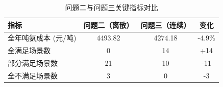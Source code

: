 \begin{table}[H]
\centering
\caption{问题二与问题三关键指标对比}
\begin{tabular}{lccc}
\toprule
指标 & 问题二（离散） & 问题三（连续） & 变化 \\
\midrule
全年吨氨成本 (元/吨) & 4493.82 & 4274.18 & -4.9\% \\
全满足场景数 & 0 & 14 & +14 \\
部分满足场景数 & 21 & 10 & -11 \\
全不满足场景数 & 3 & 0 & -3 \\
\bottomrule
\end{tabular}
\end{table}
